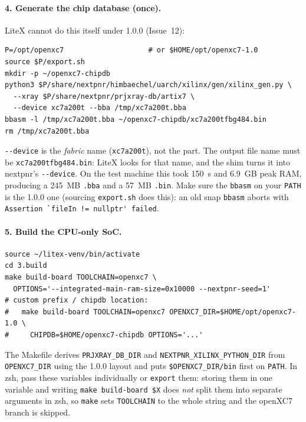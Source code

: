 \documentclass[11pt]{article}
\begin{document}
\paragraph{4. Generate the chip database (once).} LiteX cannot do this
itself under 1.0.0 (Issue~12):
\begin{lstlisting}[style=termout]
P=/opt/openxc7                    # or $HOME/opt/openxc7-1.0
source $P/export.sh
mkdir -p ~/openxc7-chipdb
python3 $P/share/nextpnr/himbaechel/uarch/xilinx/gen/xilinx_gen.py \
  --xray $P/share/nextpnr/prjxray-db/artix7 \
  --device xc7a200t --bba /tmp/xc7a200t.bba
bbasm -l /tmp/xc7a200t.bba ~/openxc7-chipdb/xc7a200tfbg484.bin
rm /tmp/xc7a200t.bba
\end{lstlisting}
\lstinline{--device} is the \emph{fabric} name (\lstinline{xc7a200t}), not
the part. The output file name must be \lstinline{xc7a200tfbg484.bin}:
LiteX looks for that name, and the shim turns it into nextpnr's
\lstinline{--device}. On the test machine this took 150~s and 6.9~GB peak
RAM, producing a 245~MB \lstinline{.bba} and a 57~MB \lstinline{.bin}.
Make sure the \lstinline{bbasm} on your \lstinline{PATH} is the 1.0.0 one
(sourcing \lstinline{export.sh} does this): an old snap \lstinline{bbasm}
aborts with \lstinline{Assertion `fileIn != nullptr' failed}.

\paragraph{5. Build the CPU-only SoC.}
\begin{lstlisting}[style=termout]
source ~/litex-venv/bin/activate
cd 3.build
make build-board TOOLCHAIN=openxc7 \
  OPTIONS='--integrated-main-ram-size=0x10000 --nextpnr-seed=1'
# custom prefix / chipdb location:
#   make build-board TOOLCHAIN=openxc7 OPENXC7_DIR=$HOME/opt/openxc7-1.0 \
#     CHIPDB=$HOME/openxc7-chipdb OPTIONS='...'
\end{lstlisting}
The Makefile derives \lstinline{PRJXRAY_DB_DIR} and
\lstinline{NEXTPNR_XILINX_PYTHON_DIR} from \lstinline{OPENXC7_DIR} using
the 1.0.0 layout and puts \lstinline{$OPENXC7_DIR/bin} first on
\lstinline{PATH}. In zsh, pass these variables individually or
\lstinline{export} them: storing them in one variable and writing
\lstinline{make build-board $X} does \emph{not} split them into separate
arguments in zsh, so \lstinline{make} sets \lstinline{TOOLCHAIN} to the
whole string and the openXC7 branch is skipped.
\end{document}
